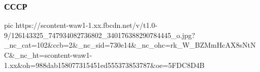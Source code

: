  
 
 

\clearpage
\subsubsection{СССР}
\label{sec:pics.ussr}

\ifcmt
pic https://scontent-waw1-1.xx.fbcdn.net/v/t1.0-9/126143325_747934082736802_340176388290784445_o.jpg?_nc_cat=102&ccb=2&_nc_sid=730e14&_nc_ohc=rk_W_BZMmHcAX8sNtNC&_nc_ht=scontent-waw1-1.xx&oh=988dab158077315451ed555373853787&oe=5FDC8D4B
\fi
